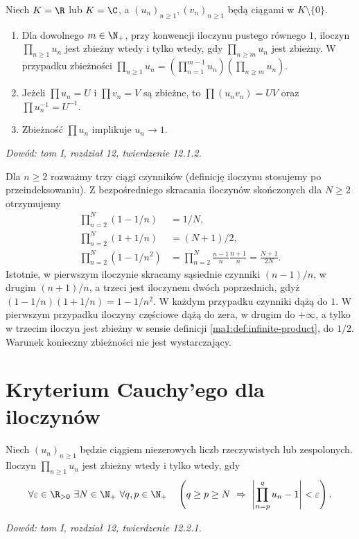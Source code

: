 \begin{twierdzenie}
\label{ma1:thm:product-elementary}
Niech $K=\R$ lub $K=\C$, a $(u_n)_{n\ge1},(v_n)_{n\ge1}$ będą ciągami w $K\setminus\{0\}$.
\begin{enumerate}[label=(\roman*)]
\item Dla dowolnego $m\in\N_+$, przy konwencji iloczynu pustego równego $1$, iloczyn $\prod_{n\ge1}u_n$ jest zbieżny wtedy i tylko wtedy, gdy $\prod_{n\ge m}u_n$ jest zbieżny. W przypadku zbieżności
$\prod_{n\ge1}u_n=(\prod_{n=1}^{m-1}u_n)(\prod_{n\ge m}u_n)$.
\item Jeżeli $\prod u_n=U$ i $\prod v_n=V$ są zbieżne, to $\prod(u_nv_n)=UV$ oraz $\prod u_n^{-1}=U^{-1}$.
\item Zbieżność $\prod u_n$ implikuje $u_n\to1$.
\end{enumerate}
\end{twierdzenie}
\emph{Dowód: tom I, rozdział 12, twierdzenie 12.1.2.}
\begin{przyklad}
\label{ma1:ex:telescoping-products}
Dla $n\ge2$ rozważmy trzy ciągi czynników (definicję iloczynu stosujemy po przeindeksowaniu). Z bezpośredniego skracania iloczynów skończonych dla $N\ge2$ otrzymujemy
\[
\begin{aligned}
 \prod_{n=2}^N(1-1/n)&=1/N,\\
 \prod_{n=2}^N(1+1/n)&=(N+1)/2,\\
 \prod_{n=2}^N(1-1/n^2)&=
 \prod_{n=2}^N\frac{n-1}{n}\frac{n+1}{n}
 =\frac{N+1}{2N}.
\end{aligned}
\]
Istotnie, w pierwszym iloczynie skracamy sąsiednie czynniki $(n-1)/n$, w drugim $(n+1)/n$, a trzeci jest iloczynem dwóch poprzednich, gdyż $(1-1/n)(1+1/n)=1-1/n^2$. W każdym przypadku czynniki dążą do $1$. W pierwszym przypadku iloczyny częściowe dążą do zera, w drugim do $+\infty$, a tylko w trzecim iloczyn jest zbieżny w sensie definicji \ref{ma1:def:infinite-product}, do $1/2$. Warunek konieczny zbieżności nie jest wystarczający.
\end{przyklad}

\section{Kryterium Cauchy'ego dla iloczynów}
\begin{twierdzenie}
\label{ma1:thm:product-cauchy}
Niech $(u_n)_{n\ge1}$ będzie ciągiem niezerowych liczb rzeczywistych lub zespolonych. Iloczyn $\prod_{n\ge1}u_n$ jest zbieżny wtedy i tylko wtedy, gdy
\[
 \forall\varepsilon\in\R_{>0}\ \exists N\in\N_+\
 \forall q,p\in\N_+\quad
 \left(q\ge p\ge N\ \Rightarrow\
 \left|\prod_{n=p}^{q}u_n-1\right|<\varepsilon\right).
\]
\end{twierdzenie}
\emph{Dowód: tom I, rozdział 12, twierdzenie 12.2.1.}

